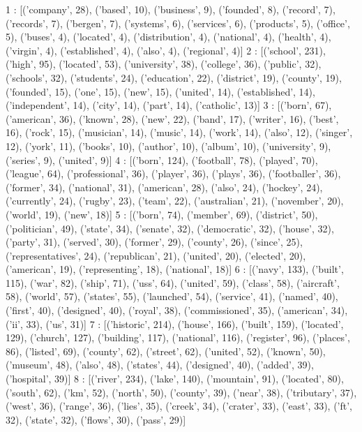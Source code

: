 1 : [('company', 28), ('based', 10), ('business', 9), ('founded', 8), ('record', 7), ('records', 7), ('bergen', 7), ('systems', 6), ('services', 6), ('products', 5), ('office', 5), ('buses', 4), ('located', 4), ('distribution', 4), ('national', 4), ('health', 4), ('virgin', 4), ('established', 4), ('also', 4), ('regional', 4)]
2 : [('school', 231), ('high', 95), ('located', 53), ('university', 38), ('college', 36), ('public', 32), ('schools', 32), ('students', 24), ('education', 22), ('district', 19), ('county', 19), ('founded', 15), ('one', 15), ('new', 15), ('united', 14), ('established', 14), ('independent', 14), ('city', 14), ('part', 14), ('catholic', 13)]
3 : [('born', 67), ('american', 36), ('known', 28), ('new', 22), ('band', 17), ('writer', 16), ('best', 16), ('rock', 15), ('musician', 14), ('music', 14), ('work', 14), ('also', 12), ('singer', 12), ('york', 11), ('books', 10), ('author', 10), ('album', 10), ('university', 9), ('series', 9), ('united', 9)]
4 : [('born', 124), ('football', 78), ('played', 70), ('league', 64), ('professional', 36), ('player', 36), ('plays', 36), ('footballer', 36), ('former', 34), ('national', 31), ('american', 28), ('also', 24), ('hockey', 24), ('currently', 24), ('rugby', 23), ('team', 22), ('australian', 21), ('november', 20), ('world', 19), ('new', 18)]
5 : [('born', 74), ('member', 69), ('district', 50), ('politician', 49), ('state', 34), ('senate', 32), ('democratic', 32), ('house', 32), ('party', 31), ('served', 30), ('former', 29), ('county', 26), ('since', 25), ('representatives', 24), ('republican', 21), ('united', 20), ('elected', 20), ('american', 19), ('representing', 18), ('national', 18)]
6 : [('navy', 133), ('built', 115), ('war', 82), ('ship', 71), ('uss', 64), ('united', 59), ('class', 58), ('aircraft', 58), ('world', 57), ('states', 55), ('launched', 54), ('service', 41), ('named', 40), ('first', 40), ('designed', 40), ('royal', 38), ('commissioned', 35), ('american', 34), ('ii', 33), ('us', 31)]
7 : [('historic', 214), ('house', 166), ('built', 159), ('located', 129), ('church', 127), ('building', 117), ('national', 116), ('register', 96), ('places', 86), ('listed', 69), ('county', 62), ('street', 62), ('united', 52), ('known', 50), ('museum', 48), ('also', 48), ('states', 44), ('designed', 40), ('added', 39), ('hospital', 39)]
8 : [('river', 234), ('lake', 140), ('mountain', 91), ('located', 80), ('south', 62), ('km', 52), ('north', 50), ('county', 39), ('near', 38), ('tributary', 37), ('west', 36), ('range', 36), ('lies', 35), ('creek', 34), ('crater', 33), ('east', 33), ('ft', 32), ('state', 32), ('flows', 30), ('pass', 29)]
